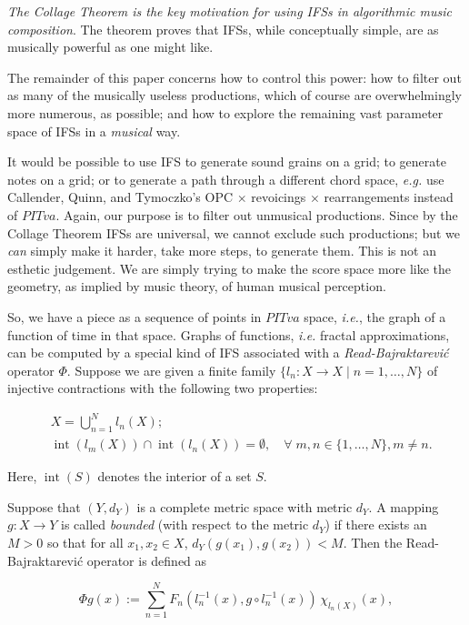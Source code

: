 \documentclass[english,11pt,letterpaper,onecolumn]{scrartcl}
\numberwithin{equation}{section}
\newcommand{\Int}{\mathop{\mathrm{int}}}
\newcommand{\be}{\begin{equation}}
\newcommand{\ee}{\end{equation}}
\begin{document}
\textit{The Collage Theorem is the key motivation for using IFSs in
algorithmic music composition}. The theorem proves that IFSs, while
conceptually simple, are as musically powerful as one might like.

The remainder of this paper concerns how to control this power: how to
filter out as many of the musically useless productions, which of course are
overwhelmingly more numerous, as possible; and how to explore the
remaining vast parameter space of IFSs in a \textit{musical} way.

It would be possible to use IFS to generate sound grains on a grid; to
generate notes on a grid; or to generate a path through a different chord
space, \textit{e.g.} use Callender, Quinn, and Tymoczko's OPC $\times$
revoicings $\times$ rearrangements instead of $PITva$. Again, our purpose is
to filter out unmusical productions. Since by the Collage Theorem IFSs are
universal, we cannot exclude such productions; but we \textit{can} simply make
it harder, take more steps, to generate them. This is not an esthetic
judgement. We are simply trying to make the score space more like the
geometry, as implied by music theory, of human musical perception.

So, we have a piece as a sequence of points in $PITva$ space, \textit{i.e.},
the graph of a function of time in that space. Graphs of functions,
\textit{i.e.} fractal approximations, can be computed by a special kind of IFS
associated with a \textit{Read-Bajraktarevi\'c} operator $\Phi$. Suppose we
are given a finite family $\{l_n : X\to X \mid n = 1, \ldots, N\}$ of
injective contractions with the following two properties:

\begin{align}
&X = \bigcup_{n=1}^N l_n(X);\label{union}\\
&\Int (l_m(X))\cap \Int(l_n(X)) = \emptyset, \quad\forall\;m, n\in \{1,\ldots,
N\}, m\neq n.\label{partition}
\end{align}

\noindent Here, $\Int (S)$ denotes the interior of a set $S$.

Suppose that $(Y,d_Y)$ is a complete metric space with metric $d_Y$. A mapping
$g:X\to Y$ is called \emph{bounded} (with respect to the metric $d_Y$) if
there exists an $M> 0$ so that for all $x_1, x_2\in X$, $d_Y(g(x_1),g(x_2)) <
M$. Then the Read-Bajraktarevi\'c operator is defined as

\be\label{RB}
\Phi g (x) := \sum\limits_{n=1}^N F_n (l_n^{-1} (x), g\circ l_n^{-1}
(x))\,\chi_{l_n(X)}(x),
\ee
\end{document}
